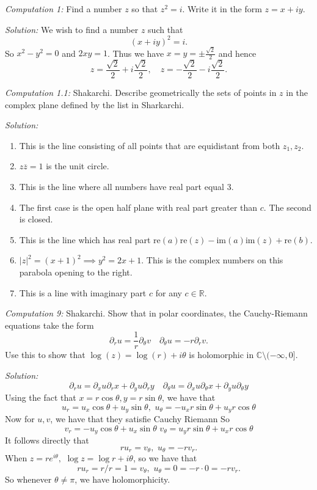 \documentclass{article}
\newcommand{\comp}[2]{
\vspace{0.2in}\begin{mdframed}[
  backgroundcolor=problem,
  skipabove=\topsep,
  skipbelow=\topsep
  ]
  \emph{Computation {#1}:} {#2}
\end{mdframed}}
\newcommand{\R}{\mathbb{R}}
\newcommand{\C}{\mathbb{C}}
\begin{document}
    \comp{1}{Find a number $z$ so that $z^2=i$. Write it in the form $z=x+iy$.}
    \textit{Solution:} We wish to find a number $z$ such that
    \[ (x+iy)^2 = i.\]
    So $x^2-y^2=0$ and $2xy=1$. Thus we have $x=y=\pm\frac{\sqrt{2}}{2}$ and hence
    \[z=\frac{\sqrt{2}}{2} + i\frac{\sqrt{2}}{2},\quad z = -\frac{\sqrt{2}}{2} - i\frac{\sqrt{2}}{2}.\]
    \comp{1.1}{Shakarchi. Describe geometrically the sets of points in $z$ in the complex plane defined by the list in Sharkarchi.}
    \textit{Solution:}
    \begin{enumerate}
      \item This is the line consisting of all points that are equidistant from both $z_1,z_2$.
      \item $z\overline{z}=1$ is the unit circle.
      \item This is the line where all numbers have real part equal 3.
      \item The first case is the open half plane with real part greater than $c$. The second is closed.
      \item This is the line which has real part $\text{re}(a)\text{re}(z) - \text{im}(a)\text{im}(z) + \text{re}(b)$.
      \item $|z|^2 = (x+1)^2 \implies y^2 =2x+1$. This is the complex numbers on this parabola opening to the right.
      \item This is a line with imaginary part $c$ for any $c\in\R$.
    \end{enumerate}
    \comp{9}{Shakarchi. Show that in polar coordinates, the Cauchy-Riemann equations take the form
    \[\partial_r u = \frac{1}{r} \partial_\theta v\quad \partial_\theta u = -r\partial_r v.\]
    Use this to show that $\log(z)=\log(r)+i\theta$ is holomorphic in $\C\setminus (-\infty,0]$.}
    \textit{Solution:}
    \[\partial_r u = \partial_x u \partial_r x + \partial_y u \partial_r y\quad \partial_\theta u = \partial_x u \partial_\theta x + \partial_y u \partial_\theta y\]
    Using the fact that $x=r\cos{\theta},y=r\sin{\theta}$, we have that
    \[u_r = u_x\cos{\theta} + u_y\sin{\theta},\,\,u_\theta = -u_xr\sin{\theta} + u_yr\cos{\theta}\]
    Now for $u,v$, we have that they satisfie Cauchy Riemann So
    \[v_r = -u_y\cos{\theta} + u_x\sin{\theta}\,\, v_\theta =u_yr\sin{\theta} + u_xr\cos{\theta}\]
    It follows directly that 
    \[ru_r = v_\theta,\,\, u_\theta = -rv_r.\]
    When $z = re^{i\theta},$
    $\log{z} = \log{r} + i\theta$, so we have that 
    \[ru_r = r/r = 1 = v_\theta,\,\,u_\theta = 0 = -r\cdot 0 = -rv_r.\]
    So whenever $\theta \neq \pi$, we have holomorphicity.
\end{document}
